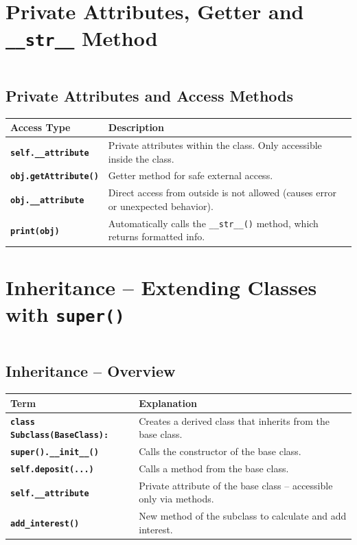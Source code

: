 \documentclass[a4paper,11pt]{article}
\begin{document}
		\newpage
		
\section{Private Attributes, Getter and \texttt{\_\_str\_\_} Method}
\inputminted{python}{Python_Files/private_attribute_guid.py}

\vspace{1em}
\subsection*{Private Attributes and Access Methods}

\renewcommand{\arraystretch}{1.4}
\begin{tabular}{>{\bfseries}p{4.5cm} p{8.5cm}}
	\toprule
	Access Type & Description \\
	\midrule
	\texttt{self.\_\_attribute} & Private attributes within the class. Only accessible inside the class. \\
	\texttt{obj.getAttribute()} & Getter method for safe external access. \\
	\texttt{obj.\_\_attribute} & Direct access from outside is not allowed (causes error or unexpected behavior). \\
	\texttt{print(obj)} & Automatically calls the \texttt{\_\_str\_\_()} method, which returns formatted info. \\
	\bottomrule
\end{tabular}

		\newpage
		
\section{Inheritance – Extending Classes with \texttt{super()}}
\inputminted{python}{Python_Files/inheritance_guid.py}

\vspace{1em}
\subsection*{Inheritance – Overview}

\renewcommand{\arraystretch}{1.4}
\begin{tabular}{>{\bfseries}p{4.5cm} p{9cm}}
	\toprule
	Term & Explanation \\
	\midrule
	\texttt{class Subclass(BaseClass):} & Creates a derived class that inherits from the base class. \\
	\texttt{super().\_\_init\_\_()} & Calls the constructor of the base class. \\
	\texttt{self.deposit(...)} & Calls a method from the base class. \\
	\texttt{self.\_\_attribute} & Private attribute of the base class – accessible only via methods. \\
	\texttt{add\_interest()} & New method of the subclass to calculate and add interest. \\
	\bottomrule
\end{tabular}
\end{document}
